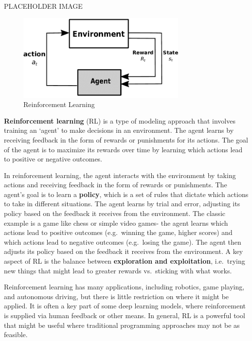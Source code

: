 \documentclass[
  letterpaper,
]{krantz}
\begin{document}
PLACEHOLDER IMAGE

\begin{figure}[H]

{\centering \includegraphics[width=0.75\textwidth,height=\textheight]{img/rl.png}

}

\caption{Reinforcement Learning}

\end{figure}%

\textbf{Reinforcement learning} (RL) is a type of modeling approach that
involves training an `agent' to make decisions in an environment. The
agent learns by receiving feedback in the form of rewards or punishments
for its actions. The goal of the agent is to maximize its rewards over
time by learning which actions lead to positive or negative outcomes.

In reinforcement learning, the agent interacts with the environment by
taking actions and receiving feedback in the form of rewards or
punishments. The agent's goal is to learn a \textbf{policy}, which is a
set of rules that dictate which actions to take in different situations.
The agent learns by trial and error, adjusting its policy based on the
feedback it receives from the environment. The classic example is a game
like chess or simple video games- the agent learns which actions lead to
positive outcomes (e.g.~winning the game, higher scores) and which
actions lead to negative outcomes (e.g.~losing the game). The agent then
adjusts its policy based on the feedback it receives from the
environment. A key aspect of RL is the balance between
\textbf{exploration and exploitation}, i.e.~trying new things that might
lead to greater rewards vs.~sticking with what works.

Reinforcement learning has many applications, including robotics, game
playing, and autonomous driving, but there is little restriction on
where it might be applied. It is often a key part of some deep learning
models, where reinforcement is supplied via human feedback or other
means. In general, RL is a powerful tool that might be useful where
traditional programming approaches may not be as feasible.
\end{document}

